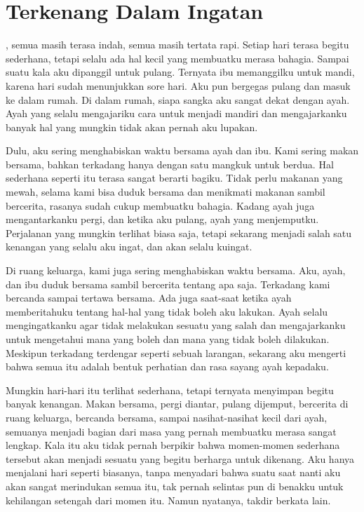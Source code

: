 \chapter*{Terkenang Dalam Ingatan}


, semua masih terasa indah, semua masih tertata rapi. Setiap hari terasa begitu sederhana, tetapi selalu ada hal kecil yang membuatku merasa bahagia. Sampai suatu kala aku dipanggil untuk pulang. Ternyata ibu memanggilku untuk mandi, karena hari sudah menunjukkan sore hari. Aku pun bergegas pulang dan masuk ke dalam rumah. Di dalam rumah, siapa sangka aku sangat dekat dengan ayah. Ayah yang selalu mengajariku cara untuk menjadi mandiri dan mengajarkanku banyak hal yang mungkin tidak akan pernah aku lupakan.

Dulu, aku sering menghabiskan waktu bersama ayah dan ibu. Kami sering makan bersama, bahkan terkadang hanya dengan satu mangkuk untuk berdua. Hal sederhana seperti itu terasa sangat berarti bagiku. Tidak perlu makanan yang mewah, selama kami bisa duduk bersama dan menikmati makanan sambil bercerita, rasanya sudah cukup membuatku bahagia. Kadang ayah juga mengantarkanku pergi, dan ketika aku pulang, ayah yang menjemputku. Perjalanan yang mungkin terlihat biasa saja, tetapi sekarang menjadi salah satu kenangan yang selalu aku ingat, dan akan selalu kuingat.

Di ruang keluarga, kami juga sering menghabiskan waktu bersama. Aku, ayah, dan ibu duduk bersama sambil bercerita tentang apa saja. Terkadang kami bercanda sampai tertawa bersama. Ada juga saat-saat ketika ayah memberitahuku tentang hal-hal yang tidak boleh aku lakukan. Ayah selalu mengingatkanku agar tidak melakukan sesuatu yang salah dan mengajarkanku untuk mengetahui mana yang boleh dan mana yang tidak boleh dilakukan. Meskipun terkadang terdengar seperti sebuah larangan, sekarang aku mengerti bahwa semua itu adalah bentuk perhatian dan rasa sayang ayah kepadaku.

Mungkin hari-hari itu terlihat sederhana, tetapi ternyata menyimpan begitu banyak kenangan. Makan bersama, pergi diantar, pulang dijemput, bercerita di ruang keluarga, bercanda bersama, sampai nasihat-nasihat kecil dari ayah, semuanya menjadi bagian dari masa yang pernah membuatku merasa sangat lengkap. Kala itu aku tidak pernah berpikir bahwa momen-momen sederhana tersebut akan menjadi sesuatu yang begitu berharga untuk dikenang. Aku hanya menjalani hari seperti biasanya, tanpa menyadari bahwa suatu saat nanti aku akan sangat merindukan semua itu, tak pernah selintas pun di benakku untuk kehilangan setengah dari momen itu. Namun nyatanya, takdir berkata lain.

